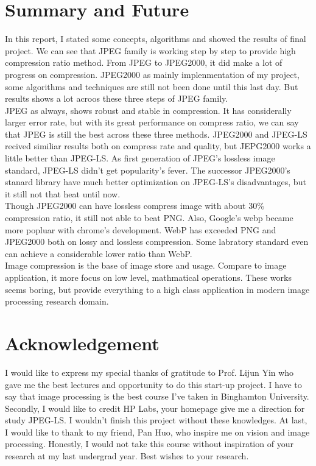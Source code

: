 \documentclass[UTF8, letterpaper, 14pt]{article}
\begin{document}
\section{Summary and Future}
In this report, I stated some concepts, algorithms and showed the results of final project. We can see that JPEG family is working step by step to provide high compression ratio method. From JPEG to JPEG2000, it did make a lot of progress on compression. JPEG2000 as mainly implenmentation of my project, some algorithms and techniques are still not been done until this last day. But results shows a lot acroos these three steps of JPEG family. \\
JPEG as always, shows robust and stable in compression. It has considerally larger error rate, but with its great performance on compress ratio, we can say that JPEG is still the best across these three methods. JPEG2000 and JPEG-LS recived similiar results both on compress rate and quality, but JEPG2000 works a little better than JPEG-LS. As first generation of JPEG's lossless image standard, JPEG-LS didn't get popularity's fever. The successor JPEG2000's stanard library have much better optimization on JPEG-LS's disadvantages, but it still not that heat until now.\\
Though JPEG2000 can have lossless compress image with about 30\% compression ratio, it still not able to beat PNG.\cite{jpeg2kwiki} Also, Google's webp became more popluar with chrome's development. WebP has exceeded PNG and JPEG2000 both on lossy and lossless compression.\cite{webp}\cite{webpwiki} Some labratory standard even can achieve a considerable lower ratio than WebP.\\
Image compression is the base of image store and usage. Compare to image application, it more focus on low level, mathmatical operations. These works seems boring, but provide everything to a high class application in modern image processing research domain.\\
\section{Acknowledgement}
I would like to express my special thanks of gratitude to Prof. Lijun Yin who gave me the best lectures and opportunity to do this start-up project. I have to say that image processing is the best course I've taken in Binghamton University. Secondly, I would like to credit HP Labs, your homepage give me a direction for study JPEG-LS. I wouldn't finish this project without these knowledges. At last, I would like to thank to my friend, Pan Huo, who inspire me on vision and image processing. Honestly, I would not take this course without inspiration of your research at my last undergrad year. Best wishes to your research.  
\end{document}
